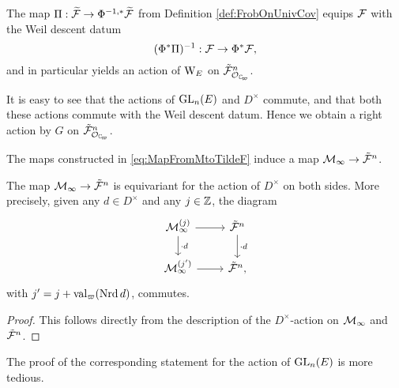 \documentclass[../main.tex]{subfiles}
\begin{document}
The map $\Pi: \widetilde{\mathcal{F}} \to \Phi^{-1,*}\widetilde{\mathcal{F}}$ from Definition 
\ref{def:FrobOnUnivCov} equips $\mathcal{F}$ with the Weil descent datum
\begin{equation*}
  (\Phi^*{\Pi})^{-1}: \mathcal{F} \to \Phi^*\mathcal{F},
\end{equation*}
and in particular yields an action of $\mathrm W_E$ on $\tilde \cF_{\cO_\Cp}^n$. 

It is easy to see that the actions of $\operatorname{GL}_n(E)$ and $D^\times$ commute,
and that both these actions commute with the Weil descent datum. Hence we
obtain a right action by $G$ on $\tilde \cF^n_{\cO_\Cp}$.

The maps constructed in \eqref{eq:MapFromMtoTildeF} induce a 
map $\mathcal{M}_\infty \to \tilde {\mathcal{F}}^n$.

\begin{lem}\label{lem:EquivarianceForD}
    The map $\mathcal{M}_\infty \to \tilde {\mathcal{F}}^n$ is equivariant 
    for the action of $D^\times$ on both sides. More precisely,
    given any $d \in D^\times$ and any $j \in \mathbb{Z}$, the diagram
    \begin{equation*}
        \begin{tikzcd}[ampersand replacement=\&]
        	{\cM_\infty^{(j)}} \& {\tilde \cF^n} \\
        	{\cM_\infty^{(j')}} \& {\tilde \cF^n},
        	\arrow[from=1-1, to=1-2]
        	\arrow["{\cdot d}", from=1-1, to=2-1]
        	\arrow["{\cdot d}", from=1-2, to=2-2]
        	\arrow[from=2-1, to=2-2]
        \end{tikzcd}
    \end{equation*}
    with $j' = j + \mathrm{val}_\varpi(\operatorname{Nrd} d)$, commutes.
    \begin{proof}
        This follows directly from the description of the $D^\times$-action on $\mathcal{M}_\infty$ and $\tilde {\mathcal{F}}^n$.
    \end{proof}
\end{lem}

The proof of the corresponding statement for the action of $\operatorname{GL}_n(E)$ is more
tedious. 
\end{document}
